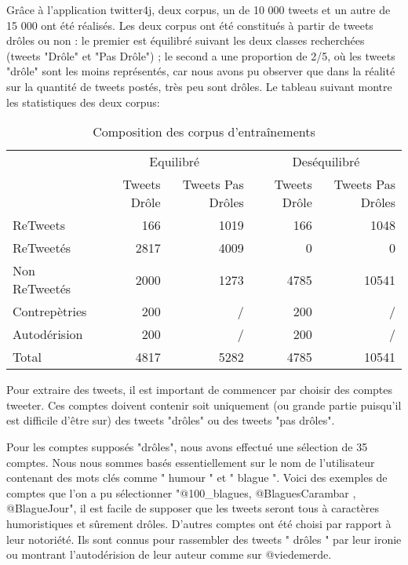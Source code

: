 \documentclass[10pt,a4paper,twoside]{article}
\begin{document}
Grâce à l'application twitter4j, deux corpus, un de 10 000 tweets et un autre de 15 000 ont été réalisés. Les deux corpus ont été constitués à partir de tweets drôles ou non : le premier est équilibré suivant les deux classes recherchées (tweets "Drôle" et "Pas Drôle") ; le second a une proportion de 2/5, où les tweets "drôle" sont les moins représentés, car nous avons pu observer que dans la réalité sur la quantité de tweets postés, très peu sont drôles. Le tableau suivant montre les statistiques des deux corpus: 

\begin{table}[!h]
\centering
	\begin{tabular}{lrrrr}
	\toprule
	& \multicolumn{2}{c}{Equilibré}  & \multicolumn{2}{c}{Deséquilibré}\\
	\cmidrule(r){2-3} \cmidrule(r){4-5}

	& Tweets Drôle & Tweets Pas Drôles &  Tweets Drôle & Tweets Pas Drôles \\
	\midrule
	 ReTweets & 166 & 1019 & 166 & 1048 \\
	
	 ReTweetés & 2817 & 4009 & 0 & 0 \\
	
	Non ReTweetés & 2000 & 1273 & 4785 & 10541 \\
	
	Contrepètries & 200 & / & 200 & / \\
	Autodérision & 200 & / & 200 & / \\
	 \midrule
	Total & 4817 & 5282 & 4785 &  10541 \\
	\bottomrule
	\end{tabular}
\caption{Composition des corpus d'entraînements}
\end{table}


Pour extraire des tweets, il est important de commencer par choisir des comptes tweeter. Ces comptes doivent contenir soit uniquement (ou grande partie puisqu'il est difficile d'être sur) des tweets "drôles" ou des tweets "pas drôles".

Pour les comptes supposés "drôles", nous avons effectué une sélection de 35 comptes. Nous nous sommes basés essentiellement sur le nom de l'utilisateur contenant des mots clés comme " humour " et " blague ". Voici des exemples de comptes que l'on a pu sélectionner "@100\_blagues, @BlaguesCarambar , @BlagueJour", il est facile de supposer que les tweets seront tous à caractères humoristiques et sûrement drôles. D'autres comptes ont été choisi par rapport à leur notoriété. Ils sont connus pour rassembler des tweets " drôles " par leur ironie ou montrant l'autodérision de leur auteur comme sur @viedemerde.
\end{document}
